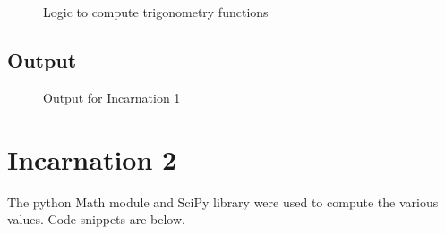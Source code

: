     \begin{figure}[h!]
      \centering
      \caption{Logic to compute trigonometry functions}
      \label{fig:trigonometric Functions}
    \end{figure}
    \pagebreak

    \subsection{Output}
    \begin{figure}[h!]
      \centering
      \caption{Output for Incarnation 1}
      \label{fig:Text-based output}
    \end{figure}
    \pagebreak

\section{Incarnation 2}
  \begin{flushleft}
    The python Math module and SciPy library were used to compute the various values. Code snippets are below.
  \end{flushleft}

